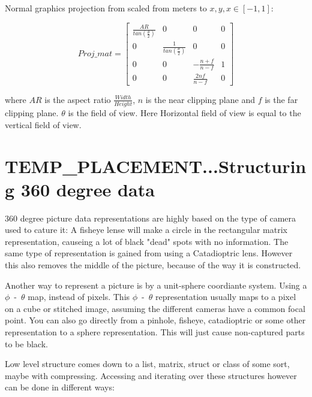 Normal graphics projection from scaled from meters to $x,y,x \in [-1,1]$:

\begin{equation}
    Proj\_mat = \begin{bmatrix}
        \frac{AR}{tan(\frac{\theta}{2})}    &   0                                   &   0   &   0   \\
        0                                   &   \frac{1}{tan(\frac{\theta}{2})}    &   0   &   0   \\
        0                                   &   0                                   &   -\frac{n+f}{n-f} & 1\\
        0                                   &   0                                   &   \frac{2nf}{n-f} & 0
    \end{bmatrix}
\end{equation}

where $AR$ is the aspect ratio $\frac{Width}{Height}$, $n$ is the near clipping plane and $f$ is the far clipping plane. $\theta$ is the field of view. Here Horizontal field of view is equal to the vertical field of view.




\section{TEMP\_PLACEMENT...Structuring 360 degree data}
360 degree picture data representations are highly based on the type of camera used to cature it: A fisheye lense will make a circle in the rectangular matrix representation, causeing a lot of black "dead" spots with no information. The same type of representation is gained from using a Catadioptric lens. However this also removes the middle of the picture, because of the way it is constructed.

Another way to represent a picture is by a unit-sphere coordiante system. Using a $\phi$~-~$\theta$ map, instead of pixels. This $\phi$~-~$\theta$ representation usually maps to a pixel on a cube or stitched image, assuming the different cameras have a common focal point. You can also go directly from a pinhole, fisheye, catadioptric or some other representation to a sphere representation. This will just cause non-captured parts to be black.

Low level structure comes down to a list, matrix, struct or class of some sort, maybe with compressing. Accessing and iterating over these structures however can be done in different ways: 

